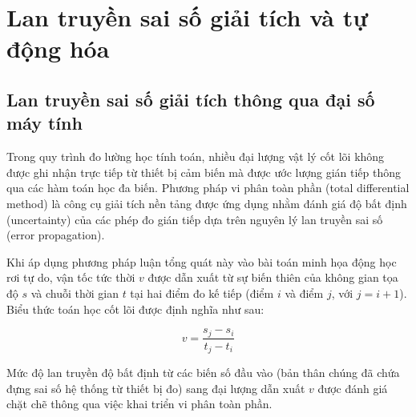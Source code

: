 \chapter{Lan truyền sai số giải tích và tự động hóa}
\section{Lan truyền sai số giải tích thông qua đại số máy tính}
\label{sec:analytical_error_propagation}

Trong quy trình đo lường học tính toán, nhiều đại lượng vật lý cốt lõi không được ghi nhận trực tiếp từ thiết bị cảm biến mà được ước lượng gián tiếp thông qua các hàm toán học đa biến. Phương pháp vi phân toàn phần (total differential method) là công cụ giải tích nền tảng được ứng dụng nhằm đánh giá độ bất định (uncertainty) của các phép đo gián tiếp dựa trên nguyên lý lan truyền sai số (error propagation).

Khi áp dụng phương pháp luận tổng quát này vào bài toán minh họa động học rơi tự do, vận tốc tức thời $v$ được dẫn xuất từ sự biến thiên của không gian tọa độ $s$ và chuỗi thời gian $t$ tại hai điểm đo kế tiếp (điểm $i$ và điểm $j$, với $j = i+1$). Biểu thức toán học cốt lõi được định nghĩa như sau:

\begin{equation}
    v = \frac{s_j - s_i}{t_j - t_i}
    \label{eq:derived_velocity}
\end{equation}

Mức độ lan truyền độ bất định từ các biến số đầu vào (bản thân chúng đã chứa đựng sai số hệ thống từ thiết bị đo) sang đại lượng dẫn xuất $v$ được đánh giá chặt chẽ thông qua việc khai triển vi phân toàn phần.

